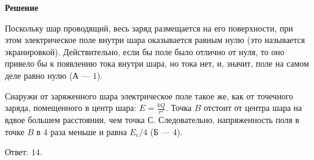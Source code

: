 \documentclass[12pt,a4paper]{article}
\begin{document}
{\begin{center}\end{center}
\par
}{
\smallskip\noindent\textbf{Решение}\par
Поскольку шар проводящий, весь заряд размещается на его поверхности, при этом электрическое поле внутри шара оказывается равным нулю (это называется экранировкой). Действительно, если бы поле было отлично от нуля, то оно привело бы к появлению тока внутри шара, но тока нет, и, значит, поле на самом деле равно нулю (А — $1$).\par
Снаружи от заряженного шара электрическое поле такое же, как от точечного заряда, помещенного в центр шара: $E= \frac{ kQ}{ r ^2 } .$ Точка $B$ отстоит от центра шара на вдвое большем расстоянии, чем точка С. Следовательно, напряженность поля в точке $B$ в $4$ раза меньше и равна $E_{c}/4$ (Б — $4$).\par
Ответ: $14$.\par
}
\end{document}
